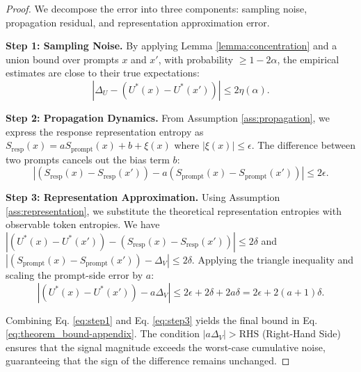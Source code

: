 \begin{proof}
We decompose the error into three components: sampling noise, propagation residual, and representation approximation error.

\noindent\textbf{Step 1: Sampling Noise.} By applying Lemma \ref{lemma:concentration} and a union bound over prompts $x$ and $x'$, with probability $\ge 1-2\alpha$, the empirical estimates are close to their true expectations:
\begin{equation}
  |\Delta_U - (U^*(x) - U^*(x'))| \le 2\eta(\alpha).
  \label{eq:step1}
\end{equation}

\noindent\textbf{Step 2: Propagation Dynamics.} From Assumption \ref{ass:propagation}, we express the response representation entropy as $S_{\text{resp}}(x) = a S_{\text{prompt}}(x) + b + \xi(x)$ where $|\xi(x)| \le \epsilon$. The difference between two prompts cancels out the bias term $b$:
\begin{equation}
  |(S_{\text{resp}}(x) - S_{\text{resp}}(x')) - a(S_{\text{prompt}}(x) - S_{\text{prompt}}(x'))| \le 2\epsilon.
  \label{eq:step2}
\end{equation}

\noindent\textbf{Step 3: Representation Approximation.} Using Assumption \ref{ass:representation}, we substitute the theoretical representation entropies with observable token entropies. We have $|(U^*(x) - U^*(x')) - (S_{\text{resp}}(x) - S_{\text{resp}}(x'))| \le 2\delta$ and $|(S_{\text{prompt}}(x) - S_{\text{prompt}}(x')) - \Delta_V| \le 2\delta$. 
Applying the triangle inequality and scaling the prompt-side error by $a$:
\begin{equation}
  |(U^*(x) - U^*(x')) - a\Delta_V| \le 2\epsilon + 2\delta + 2a\delta = 2\epsilon + 2(a+1)\delta.
  \label{eq:step3}
\end{equation}

Combining Eq. \eqref{eq:step1} and Eq. \eqref{eq:step3} yields the final bound in Eq. \eqref{eq:theorem_bound-appendix}. The condition $|a\Delta_V| > \text{RHS}$ (Right-Hand Side) ensures that the signal magnitude exceeds the worst-case cumulative noise, guaranteeing that the sign of the difference remains unchanged.
\end{proof}

